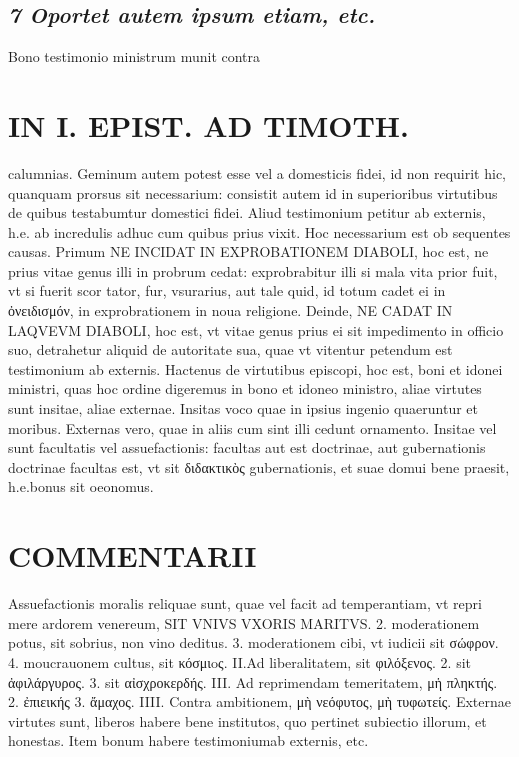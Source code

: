 \documentclass{article}
\begin{document}
\begin{pages}
\subsection*{\textit{7 Oportet autem ipsum etiam, etc. }}\pstart Bono testimonio ministrum munit contra  \pend
\section*{IN I. EPIST. AD TIMOTH. }
\marginpar{[ p.69 ]}\pstart calumnias. Geminum autem potest esse vel a domesticis fidei, id non requirit hic, quanquam prorsus sit necessarium: consistit autem id in superioribus  virtutibus  de quibus  testabumtur domestici fidei. Aliud testimonium petitur ab externis, h.e. ab incredulis adhuc cum quibus  prius vixit. Hoc necessarium est ob sequentes causas. Primum NE INCIDAT IN EXPROBATIONEM DIABOLI, hoc est, ne prius vitae genus illi in probrum cedat: exprobrabitur illi si mala vita prior fuit, vt si fuerit scor tator, fur, vsurarius, aut tale quid, id totum cadet ei in ὀνειδισμόν, in exprobrationem in noua religione. Deinde, NE CADAT IN LAQVEVM DIABOLI, hoc est, vt vitae genus prius ei sit impedimento in officio suo, detrahetur aliquid de autoritate sua, quae vt vitentur petendum est testimonium ab externis. Hactenus de virtutibus episcopi, hoc est, boni et idonei ministri, quas hoc ordine digeremus in bono et idoneo ministro, aliae virtutes sunt insitae, aliae externae. Insitas voco quae in ipsius ingenio quaeruntur et moribus. Externas vero, quae in aliis cum sint illi cedunt ornamento. Insitae vel sunt facultatis vel assuefactionis: facultas aut est doctrinae, aut gubernationis doctrinae facultas est, vt sit διδακτικὸς gubernationis, et suae domui bene praesit, h.e.bonus sit oeonomus.  \pend
\section*{COMMENTARII }
\marginpar{[ p.70 ]}\pstart Assuefactionis moralis reliquae sunt, quae vel facit ad temperantiam, vt repri mere ardorem venereum, SIT VNIVS VXORIS MARITVS. 2. moderationem potus, sit sobrius, non vino deditus. 3. moderationem cibi, vt iudicii sit σώφρον. 4. moucrauonem cultus, sit κόσμιoς.  \pend\pstart II.Ad liberalitatem, sit φιλόξενος. 2. sit ἀφιλάργυρος. 3. sit αἰσχροκερδής.  \pend\pstart III. Ad reprimendam temeritatem, μἡ πληκτής. 2. ἐπιεικής 3. ἄμαχος.  \pend\pstart IIII. Contra ambitionem, μὴ νεόφυτος, μὴ τυφωτείς.  \pend\pstart Externae virtutes sunt, liberos habere bene institutos, quo pertinet subiectio illorum, et honestas. Item bonum habere testimoniumab externis, etc.  \pend
{}
{}

\end{pages}
\end{document}

